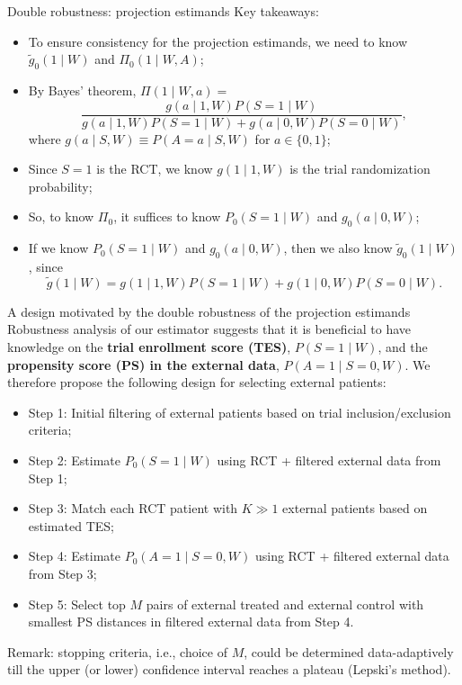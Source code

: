 \documentclass[t]{beamer}
\begin{document}
\begin{frame}{Double robustness: projection estimands}
Key takeaways:
\footnotesize
\begin{itemize}
\item To ensure consistency for the projection estimands, we need to know $\tilde{g}_0(1\mid W)$ and $\Pi_0(1\mid W,A)$;
\item By Bayes' theorem, $\Pi(1\mid W,a)=$
$$
\frac{g(a\mid 1,W)P(S=1\mid W)}{g(a\mid 1,W)P(S=1\mid W)+g(a\mid 0,W)P(S=0\mid W)},
$$
where $g(a\mid S,W)\equiv P(A=a\mid S,W)$ for $a\in\{0,1\}$;
\item Since $S=1$ is the RCT, we know $g(1\mid 1,W)$ is the trial randomization probability;
\item So, to know $\Pi_0$, it suffices to know $P_0(S=1\mid W)$ and $g_0(a\mid 0,W)$;
\item If we know $P_0(S=1\mid W)$ and $g_0(a\mid 0,W)$, then we also know $\tilde{g}_0(1\mid W)$, since
$$
\tilde{g}(1\mid W)=g(1\mid 1,W)P(S=1\mid W)+g(1\mid 0,W)P(S=0\mid W).
$$
\end{itemize}
\end{frame}

\begin{frame}{A design motivated by the double robustness of the projection estimands}
\footnotesize
Robustness analysis of our estimator suggests that it is beneficial to have knowledge on the \textbf{trial enrollment score (TES)}, $P(S=1\mid W)$, and the \textbf{propensity score (PS) in the external data}, $P(A=1\mid S=0,W)$. We therefore propose the following design for selecting external patients:
\begin{itemize}
\item Step 1: Initial filtering of external patients based on trial inclusion/exclusion criteria;
\item Step 2: Estimate $P_0(S=1\mid W)$ using RCT + filtered external data from Step 1;
\item Step 3: Match each RCT patient with $K\gg 1$ external patients based on estimated TES;
\item Step 4: Estimate $P_0(A=1\mid S=0,W)$ using RCT + filtered external data from Step 3;
\item Step 5: Select top $M$ pairs of external treated and external control with smallest PS distances in filtered external data from Step 4.
\end{itemize}
Remark: stopping criteria, i.e., choice of $M$, could be determined data-adaptively till the upper (or lower) confidence interval reaches a plateau (Lepski's method). 
\end{frame}
\end{document}

